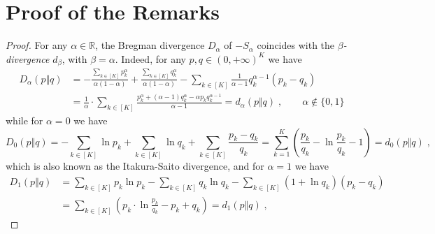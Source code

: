 \documentclass[11pt,oneside,a4paper]{article}
\newcommand{\R}{\mathbb{R}}
\newcommand{\lrb}[1]{\left(#1\right)}
\theoremstyle{plain}
\theoremstyle{definition}
\theoremstyle{remark}
\begin{document}
\section{Proof of the Remarks}
\label{app:remarks}
{\renewcommand{\proofname}{Proof of Remark \ref{r:beta-divergences}}\begin{proof}
For any $\alpha \in \R$, the Bregman divergence $D_\alpha$ of $-S_\alpha$ coincides with the \emph{$\beta$-divergence} $d_\beta$, with $\beta = \alpha$.
Indeed, for any $p,q \in (0,+\infty)^K$ we have
\begin{align*}
    D_{\alpha}(p\Vert q)
&=
    -\frac{\sum_{k \in[K]} p_k^\alpha}{\alpha(1-\alpha)} + \frac{\sum_{k \in[K]} q_k^\alpha}{\alpha(1-\alpha)}  - \sum_{k \in[K]} \frac{1}{\alpha-1} q_k^{\alpha-1}(p_k-q_k)
\\
&=
    \frac{1}{\alpha} \cdot \sum_{k \in [K]} \frac{p_k^\alpha + (\alpha-1)q_k^\alpha-\alpha p_kq_k^{\alpha-1}}{\alpha-1}
=
    d_\alpha(p \Vert q)\;, \qquad \alpha \notin \{0,1\}
\end{align*}
while for $\alpha = 0$ we have
\[
    D_{0}(p \Vert q)
=
    -\sum_{k \in [K]} \ln p_k
    +\sum_{k \in [K]} \ln q_k
    +\sum_{k \in [K]} \frac{p_k-q_k}{q_k}
=
    \sum_{k=1}^K
    \lrb{ \frac{p_k}{q_k} -\ln\frac{p_k}{q_k} -1 }
=
    d_0(p\Vert q)\;,
\]
which is also known as the Itakura-Saito divergence, and for $\alpha = 1$ we have
\begin{align*}    
    D_{1}(p\Vert q)
&=
    \sum_{k \in [K]} p_k \ln p_k - \sum_{k \in [K]} q_k \ln q_k - \sum_{k \in [K]} (1+\ln q_k)(p_k-q_k)
\\
&=
    \sum_{k \in [K]} \lrb{ p_k \cdot\ln\frac{p_k}{q_k} - p_k + q_k}
=
    d_1(p\Vert q)\;,
\end{align*}


\end{proof}}
\end{document}
